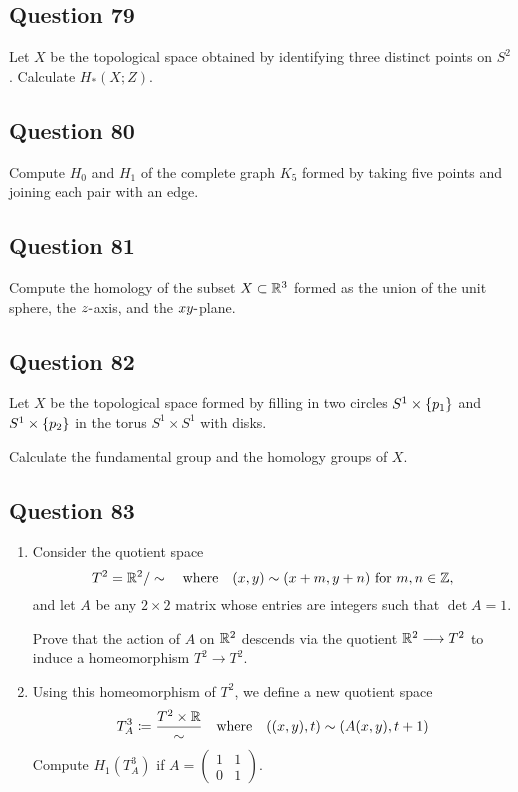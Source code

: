 \documentclass[12pt]{article}
\begin{document}
\hypertarget{question-79-3}{%
\subsection{Question 79}\label{question-79-3}}

Let \(X\) be the topological space obtained by identifying three
distinct points on \(S^2\). Calculate \(H_* (X; Z)\).

\hypertarget{question-80-3}{%
\subsection{Question 80}\label{question-80-3}}

Compute \(H_0\) and \(H_1\) of the complete graph \(K_5\) formed by
taking five points and joining each pair with an edge.

\hypertarget{question-81-3}{%
\subsection{Question 81}\label{question-81-3}}

Compute the homology of the subset \(X \subset {\mathbb{R}}^3\) formed as the
union of the unit sphere, the \(z{\hbox{-}}\)axis, and the \(xy{\hbox{-}}\)plane.

\hypertarget{question-82-3}{%
\subsection{Question 82}\label{question-82-3}}

Let \(X\) be the topological space formed by filling in two circles
\(S^1 \times \left\{{p_1 }\right\}\) and \(S^1 \times \left\{{p_2 }\right\}\) in the
torus \(S^1 \times S^1\) with disks.

Calculate the fundamental group and the homology groups of \(X\).

\hypertarget{question-83-3}{%
\subsection{Question 83}\label{question-83-3}}

\begin{enumerate}
\def\labelenumi{\alph{enumi}.}
\item
  Consider the quotient space \[
  T^2 = {\mathbb{R}}^2 / \sim {\quad \operatorname{where} \quad} (x, y) \sim (x + m, y + n) \text{ for } m, n \in {\mathbb{Z}}
  ,\] and let \(A\) be any \(2 \times 2\) matrix whose entries are
  integers such that \(\det A = 1\).

  Prove that the action of \(A\) on \({\mathbb{R}}^2\) descends via the quotient
  \({\mathbb{R}}^2 \longrightarrow T^2\) to induce a homeomorphism \(T^2 \to T^2\).
\item
  Using this homeomorphism of \(T^2\), we define a new quotient space \[
  T_A^3 \coloneqq {T^2\times{\mathbb{R}}\over \sim} {\quad \operatorname{where} \quad} ((x, y), t) \sim (A(x, y), t + 1)
  \] Compute \(H_1 (T_A^3 )\) if
  \(A=\left(\begin{array}{ll} 1 & 1 \\ 0 & 1 \end{array}\right).\)
\end{enumerate}
\end{document}
